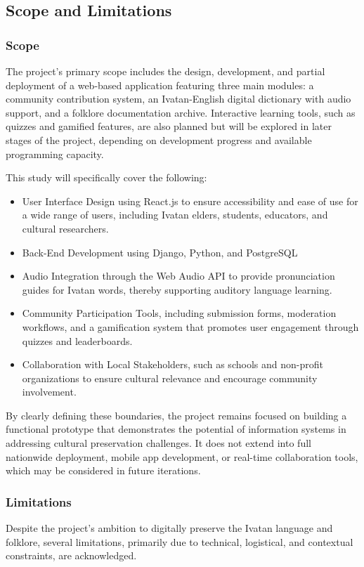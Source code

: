     \subsection{Scope and Limitations}

        \subsubsection{Scope}
            The project’s primary scope includes the design, development, and partial deployment of a web-based application featuring three main modules: a community contribution system, an Ivatan-English digital dictionary with audio support, and a folklore documentation archive. Interactive learning tools, such as quizzes and gamified features, are also planned but will be explored in later stages of the project, depending on development progress and available programming capacity.
            
            This study will specifically cover the following:
            \begin{itemize}
                \item User Interface Design using React.js to ensure accessibility and ease of use for a wide range of users, including Ivatan elders, students, educators, and cultural researchers.
                \item Back-End Development using Django, Python, and PostgreSQL
                \item Audio Integration through the Web Audio API to provide pronunciation guides for Ivatan words, thereby supporting auditory language learning.
                \item Community Participation Tools, including submission forms, moderation workflows, and a gamification system that promotes user engagement through quizzes and leaderboards.
                \item Collaboration with Local Stakeholders, such as schools and non-profit organizations to ensure cultural relevance and encourage community involvement.
            \end{itemize}
            By clearly defining these boundaries, the project remains focused on building a functional prototype that demonstrates the potential of information systems in addressing cultural preservation challenges. It does not extend into full nationwide deployment, mobile app development, or real-time collaboration tools, which may be considered in future iterations.
        \subsubsection{Limitations}
            Despite the project's ambition to digitally preserve the Ivatan language and folklore, several limitations, primarily due to technical, logistical, and contextual constraints, are acknowledged. 

